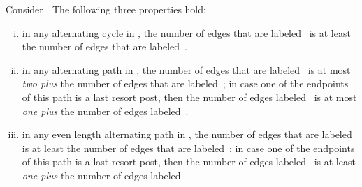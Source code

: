 \documentclass[11pt]{llncs}
\begin{document}
\begin{lemma}
\label{lem:1-3}
Consider . The following three properties hold:
\begin{enumerate}[(i)]
\item\label{le2i} in any alternating cycle in  , the number of edges that are 
labeled~ is at least the number of edges that are labeled~.
\item\label{le2ii} in any alternating path in , the number of edges that are 
labeled~ is at most {\em two plus} the number of edges that are labeled~; in case one 
of the endpoints of this path is a last resort post, then the number of edges labeled~ is 
at most {\em one plus} the number of edges labeled~.
\item\label{le2iii} in any even length alternating path in , the number of edges 
that are labeled~ is at least the number of edges that are labeled~;
in case one of the endpoints of this path is a last resort post, then
the number of edges labeled~ is at least  {\em one plus} the number of edges labeled~.
\end{enumerate}
\end{lemma}
\end{document}
